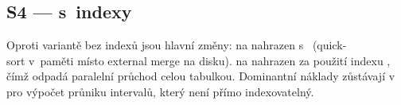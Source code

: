 \begin{longlisting}
  \caption{S4: EXPLAIN ANALYZE bez indexů (Execution Time: 111,4 ms)}
  \label{lst:appendix:explain:s4:no_idx}
  \inputminted[fontsize=\scriptsize]{text}{./code/sql/explain_q4_no_idx.txt}
\end{longlisting}

\subsection*{S4 --- s~indexy}

Oproti variantě bez indexů jsou hlavní změny:  na  nahrazen  s~ (quick-\\sort v~paměti místo external merge na disku).  na  nahrazen  za použití indexu , čímž odpadá paralelní průchod celou tabulkou. Dominantní náklady zůstávají v~ pro výpočet průniku intervalů, který není přímo indexovatelný.

\begin{longlisting}
  \caption{S4: EXPLAIN ANALYZE s~indexy (Execution Time: 74,6 ms)}
  \label{lst:appendix:explain:s4:idx}
  \inputminted[fontsize=\scriptsize]{text}{./code/sql/explain_q4_idx.txt}
\end{longlisting}
